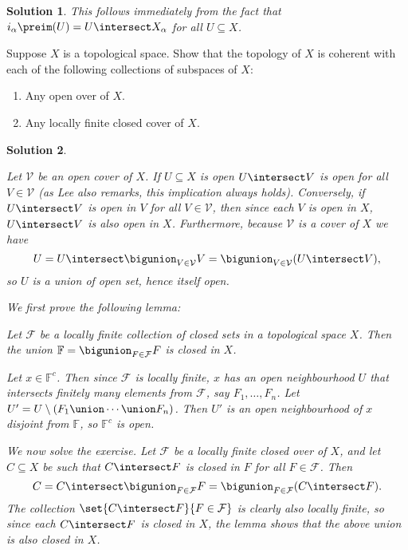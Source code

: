 \documentclass[article, a4paper, 11pt, oneside]{memoir}
\numberwithin{equation}{chapter}
\theoremstyle{nonumberplain}
\newtheorem{solution}{Solution}
\newenvironment{displaytheorem}{%
	\begin{displayquote}\itshape%
}{%
	\end{displayquote}%
}
\newcommand{\calV}{\mathcal{V}}
\newcommand{\calF}{\mathcal{F}}
\newcommand{\bbF}{\mathbb{F}}
\begin{document}
\begin{solution}
    This follows immediately from the fact that $i_\alpha\preim(U) = U \intersect X_\alpha$ for all $U \subseteq X$.
\end{solution}


\begin{problemframed*}[6]
    Suppose $X$ is a topological space. Show that the topology of $X$ is coherent with each of the following collections of subspaces of $X$:
    \begin{enumerate}
        \item Any open over of $X$.
        \item Any locally finite closed cover of $X$.
    \end{enumerate}
\end{problemframed*}

\begin{solution}
\begin{solutionsec}
    \item Let $\calV$ be an open cover of $X$. If $U \subseteq X$ is open $U \intersect V$ is open for all $V \in \calV$ (as Lee also remarks, this implication always holds). Conversely, if $U \intersect V$ is open in $V$ for all $V \in \calV$, then since each $V$ is open in $X$, $U \intersect V$ is also open in $X$. Furthermore, because $\calV$ is a cover of $X$ we have
    \begin{equation*}
        U
            = U \intersect \bigunion_{V \in \calV} V
            = \bigunion_{V \in \calV} (U \intersect V),
    \end{equation*}
    so $U$ is a union of open set, hence itself open.

    \item We first prove the following lemma:
    \begin{displaytheorem}
        Let $\calF$ be a locally finite collection of closed sets in a topological space $X$. Then the union $\bbF = \bigunion_{F \in \calF} F$ is closed in $X$.
    \end{displaytheorem}
    Let $x \in \bbF^c$. Then since $\calF$ is locally finite, $x$ has an open neighbourhood $U$ that intersects finitely many elements from $\calF$, say $F_1, \ldots, F_n$. Let $U' = U \setminus (F_1 \union \cdots \union F_n)$. Then $U'$ is an open neighbourhood of $x$ disjoint from $\bbF$, so $\bbF^c$ is open.
    
    We now solve the exercise. Let $\calF$ be a locally finite closed over of $X$, and let $C \subseteq X$ be such that $C \intersect F$ is closed in $F$ for all $F \in \calF$. Then
    \begin{equation*}
        C
            = C \intersect \bigunion_{F \in \calF} F
            = \bigunion_{F \in \calF} (C \intersect F).
    \end{equation*}
    The collection $\set{C \intersect F}{F \in \calF}$ is clearly also locally finite, so since each $C \intersect F$ is closed in $X$, the lemma shows that the above union is also closed in $X$.
\end{solutionsec}
\end{solution}
\end{document}
